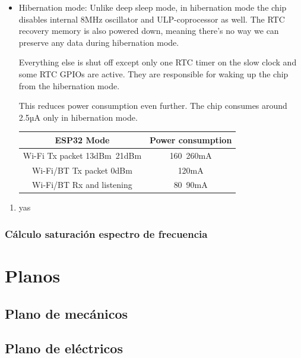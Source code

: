 \documentclass[a4paper ,12pt, onecolumn]{article}
\begin{document}
\begin{itemize}
                \item Hibernation mode: Unlike deep sleep mode, in hibernation mode the chip disables internal 8MHz oscillator and ULP-coprocessor as well. The RTC recovery memory is also powered down, meaning there’s no way we can preserve any data during hibernation mode.
            
                Everything else is shut off except only one RTC timer on the slow clock and some RTC GPIOs are active. They are responsible for waking up the chip from the hibernation mode.
                
                This reduces power consumption even further. The chip consumes around 2.5µA only in hibernation mode.
            
                \begin{center}
                    \begin{tabular}{||c | c ||} 
                    \hline
                    ESP32 Mode & Power consumption  \\ [0.5ex] 
                    \hline\hline
                    Wi-Fi Tx packet 13dBm~21dBm & 160~260mA  \\ 
                    \hline
                    Wi-Fi/BT Tx packet 0dBm	 & 120mA  \\
                    \hline
                    Wi-Fi/BT Rx and listening & 80~90mA  \\
                    \hline
                \end{tabular}
                \end{center}
            \end{itemize}
            \begin{enumerate}
                \item  yas
            \end{enumerate}
        \subsubsection{Cálculo saturación espectro de frecuencia}


\section{Planos}
    \subsection{Plano de mecánicos}
    \subsection{Plano de eléctricos}
\end{document}
